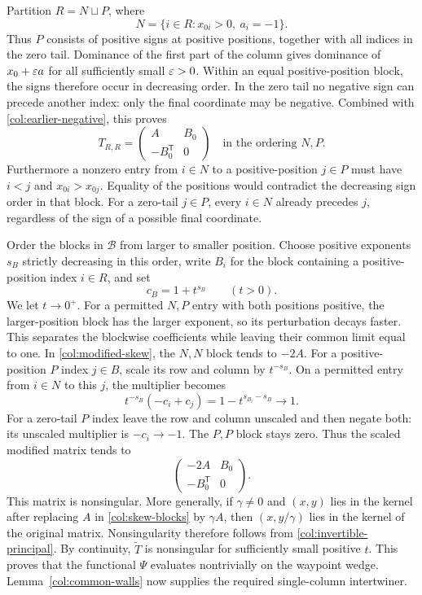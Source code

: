 Partition $R=N\sqcup P$, where
\[
 N=\{i\in R:x_{0i}>0,\ a_i=-1\}.
\]
Thus $P$ consists of positive signs at positive positions, together
with all indices in the zero tail.  Dominance of the first part of
the column gives dominance of $x_0+\varepsilon a$ for all sufficiently
small $\varepsilon>0$.  Within an equal positive-position block, the signs
therefore occur in decreasing order.  In the zero tail no negative
sign can precede another index: only the final coordinate may be
negative.  Combined with \eqref{col:earlier-negative}, this proves
\begin{equation}\label{col:skew-blocks}
 T_{R,R}=\begin{pmatrix}A&B_0\\-B_0^{\mathsf T}&0\end{pmatrix}
 \quad\text{in the ordering }N,P.
\end{equation}
Furthermore a nonzero entry from $i\in N$ to a positive-position
$j\in P$ must have $i<j$ and $x_{0i}>x_{0j}$.  Equality of the
positions would contradict the decreasing sign order in that block.
For a zero-tail $j\in P$, every $i\in N$ already precedes $j$,
regardless of the sign of a possible final coordinate.

Order the blocks in $\mathcal B$ from larger to smaller position.
Choose positive exponents $s_B$ strictly decreasing in this order,
write $B_i$ for the block containing a positive-position index $i\in R$,
and set
\[
 c_B=1+t^{s_B}\qquad(t>0).
\]
We let $t\to0^+$.  For a permitted $N,P$ entry with both positions
positive, the larger-position block has the larger exponent, so its
perturbation decays faster.  This separates the blockwise coefficients
while leaving their common limit equal to one.
In \eqref{col:modified-skew}, the $N,N$ block tends to $-2A$.
For a positive-position $P$ index $j\in B$, scale its row and column
by $t^{-s_B}$.  On a permitted entry from $i\in N$ to this $j$,
the multiplier becomes
\[
 t^{-s_B}(-c_i+c_j)
 =1-t^{s_{B_i}-s_B}\longrightarrow1.
\]
For a zero-tail $P$ index leave the row and column unscaled and then
negate both: its unscaled multiplier is $-c_i\to-1$.
The $P,P$ block stays zero.  Thus the scaled modified matrix tends to
\begin{equation}\label{col:skew-limit}
 \begin{pmatrix}-2A&B_0\\-B_0^{\mathsf T}&0\end{pmatrix}.
\end{equation}
This matrix is nonsingular.  More generally, if
$\gamma\ne0$ and $(x,y)$ lies in the kernel after replacing $A$ in
\eqref{col:skew-blocks} by $\gamma A$, then $(x,y/\gamma)$ lies in
the kernel of the original matrix.  Nonsingularity therefore follows
from \eqref{col:invertible-principal}.  By continuity,
$\widetilde T$ is nonsingular for sufficiently small positive $t$.
This proves that the functional $\Psi$ evaluates nontrivially on the
waypoint wedge.  Lemma~\ref{col:common-walls} now supplies the
required single-column intertwiner.

